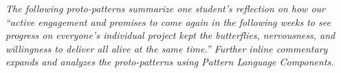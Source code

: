 \documentclass[acmlarge,timestamp]{acmart}
\begin{document}

\emph{The following proto-patterns summarize one student’s reflection
on how our “active engagement and promises to come again in the
following weeks to see progress on everyone’s individual project kept
the butterflies, nervousness, and willingness to deliver all alive at
the same time.”  Further inline commentary expands and analyzes the
proto-patterns using {\sc Pattern Language Components}.}


\end{document}
